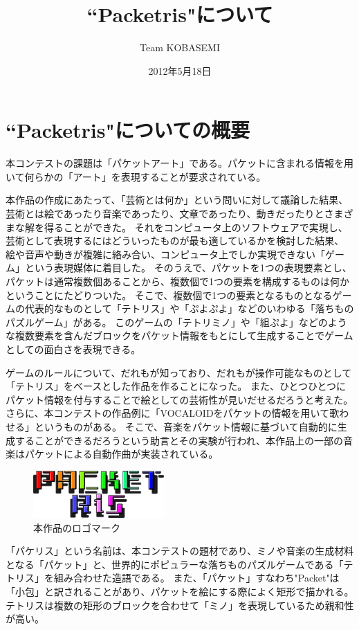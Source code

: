 \documentclass[11pt,a4paper]{jsarticle}
\title{``Packetris"について}
\author{Team KOBASEMI}
\date{2012年5月18日}
\begin{document}
\maketitle
\tableofcontents
\newpage

\section{``Packetris"についての概要}
本コンテストの課題は「パケットアート」である。パケットに含まれる情報を用いて何らかの「アート」を表現することが要求されている。

本作品の作成にあたって、「芸術とは何か」という問いに対して議論した結果、芸術とは絵であったり音楽であったり、文章であったり、動きだったりとさまざまな解を得ることができた。
それをコンピュータ上のソフトウェアで実現し、芸術として表現するにはどういったものが最も適しているかを検討した結果、
絵や音声や動きが複雑に絡み合い、コンピュータ上でしか実現できない「ゲーム」という表現媒体に着目した。
そのうえで、パケットを1つの表現要素とし、パケットは通常複数個あることから、複数個で1つの要素を構成するものは何かということにたどりついた。
そこで、複数個で1つの要素となるものとなるゲームの代表的なものとして「テトリス」や「ぷよぷよ」などのいわゆる「落ちものパズルゲーム」がある。
このゲームの「テトリミノ」や「組ぷよ」などのような複数要素を含んだブロックをパケット情報をもとにして生成することでゲームとしての面白さを表現できる。

ゲームのルールについて、だれもが知っており、だれもが操作可能なものとして「テトリス」をベースとした作品を作ることになった。
また、ひとつひとつにパケット情報を付与することで絵としての芸術性が見いだせるだろうと考えた。
さらに、本コンテストの作品例に「VOCALOIDをパケットの情報を用いて歌わせる」というものがある。
そこで、音楽をパケット情報に基づいて自動的に生成することができるだろうという助言とその実験が行われ、本作品上の一部の音楽はパケットによる自動作曲が実装されている。

\begin{figure}[htbp]
  \begin{center}
  \includegraphics[width=5cm]{logo.png}
  \caption{本作品のロゴマーク}
  \label{logo}
  \end{center}
\end{figure}

「パケリス」という名前は、本コンテストの題材であり、ミノや音楽の生成材料となる「パケット」と、世界的にポピュラーな落ちものパズルゲームである「テトリス」を組み合わせた造語である。
また、「パケット」すなわち"Packet"は「小包」と訳されることがあり、パケットを絵にする際によく矩形で描かれる。
テトリスは複数の矩形のブロックを合わせて「ミノ」を表現しているため親和性が高い。
\end{document}
